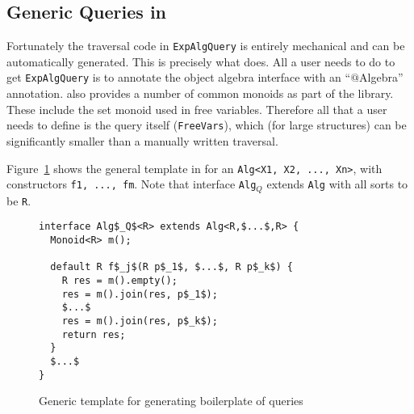 \subsection{Generic Queries in \name}

Fortunately the traversal code in \lstinline{ExpAlgQuery} is entirely
mechanical and can be automatically generated.  This is precisely what
\name does. All a user needs to do to get \lstinline{ExpAlgQuery} is
to annotate the object algebra interface with an ``$@$Algebra''
annotation. \name also provides a number of common monoids as part of
the library. These include the set monoid used in free variables.
Therefore all that a user needs to define is the query itself
(\lstinline{FreeVars}), which (for large structures) can be
significantly smaller than a manually written traversal.

Figure~\ref{queryTemplate} shows the general template in \name for an \lstinline{Alg<X1, X2, ..., Xn>}, with constructors \lstinline{f1, ..., fm}.
Note that interface \lstinline{Alg}$_Q$ extends \lstinline{Alg} with all sorts to be \lstinline{R}.

\begin{figure}[t]
\begin{lstlisting}[mathescape=true]
interface Alg$_Q$<R> extends Alg<R,$...$,R> {
  Monoid<R> m();

  default R f$_j$(R p$_1$, $...$, R p$_k$) {
    R res = m().empty();
    res = m().join(res, p$_1$);
    $...$
    res = m().join(res, p$_k$);
    return res;
  }
  $...$
}
\end{lstlisting}
\caption{Generic template for generating boilerplate of queries}
\label{queryTemplate}
\end{figure}

